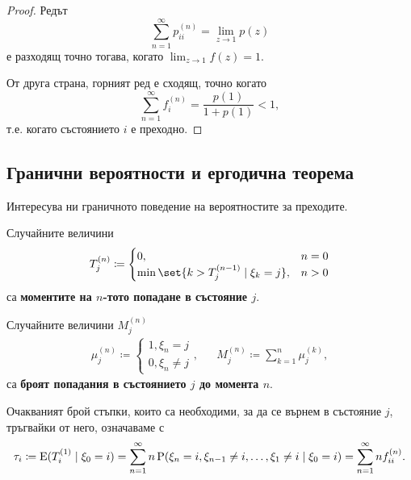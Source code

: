 \documentclass{../../common/topic}
\begin{document}
\begin{proof}
  Редът
  \begin{equation*}
    \sum_{n=1}^\infty p^{(n)}_{ii} = \lim_{z \to 1} p(z)
  \end{equation*}
  е разходящ точно тогава, когато \( \lim_{z \to 1} f(z) = 1 \).

  От друга страна, горният ред е сходящ, точно когато
  \begin{equation*}
    \sum_{n=1}^\infty f_i^{(n)} = \frac {p(1)} {1 + p(1)} < 1,
  \end{equation*}
  т.е. когато състоянието \( i \) е преходно.
\end{proof}

\subsection{Гранични вероятности и ергодична теорема}

Интересува ни граничното поведение на вероятностите за преходите.

\begin{definition}
  Случайните величини
  \begin{align*}
    T_j^{(n)}
    \coloneqq
    \begin{cases}
      0, &n = 0 \\
      \min \set{ k > T_j^{(n-1)} \mid \xi_k = j }, &n > 0
    \end{cases}
  \end{align*}
  са \textbf{моментите на \( n \)-тото попадане в състояние \( j \)}.

  Случайните величини \( M_j^{(n)} \)
  \begin{align*}
    \mu_j^{(n)}
    \coloneqq
    \begin{cases}
      1, \xi_n = j \\
      0, \xi_n \neq j
    \end{cases},
    &&
    M_j^{(n)}
    \coloneqq
    \sum_{k=1}^n \mu_j^{(k)},
  \end{align*}
  са \textbf{броят попадания в състоянието \( j \) до момента \( n \)}.

  Очакваният брой стъпки, които са необходими, за да се върнем в състояние \( j \), тръгвайки от него, означаваме с
  \begin{equation*}
    \tau_i
    \coloneqq
    \operatorname{E}(T_i^{(1)} \mid \xi_0 = i)
    =
    \sum_{n=1}^\infty n \operatorname{P}(\xi_n = i, \xi_{n-1} \neq i, \ldots, \xi_1 \neq i \mid \xi_0 = i)
    =
    \sum_{n=1}^\infty n f^{(n)}_{ii}.
  \end{equation*}
\end{definition}
\end{document}

